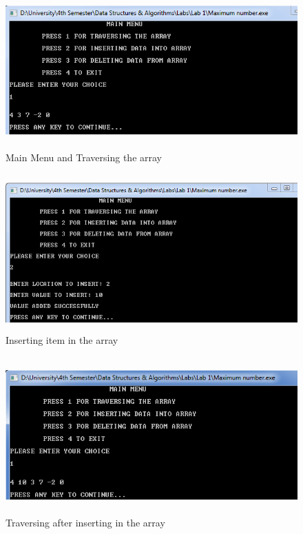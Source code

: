 \documentclass[11pt]{article}            %
\begin{document}
\begin{figure}[H]
\centering
  \includegraphics[width=12cm,height=6cm,keepaspectratio]{3.png}
\caption{Main Menu and Traversing the array}
\label{Figure:3}    
\end{figure}

\begin{figure}[H]
\centering
  \includegraphics[width=12cm,height=6cm,keepaspectratio]{4.png}
\caption{Inserting item in the array}
\label{Figure:4}    
\end{figure}

\begin{figure}[H]
\centering
  \includegraphics[width=12cm,height=6cm,keepaspectratio]{5.png}
\caption{Traversing after inserting in the array}
\label{Figure:5}    
\end{figure}
\end{document}
